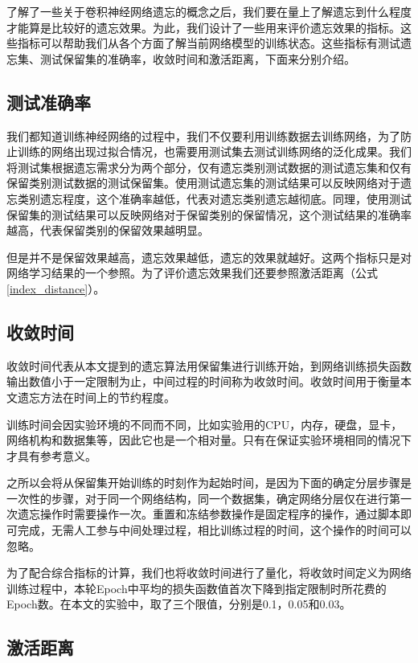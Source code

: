 了解了一些关于卷积神经网络遗忘的概念之后，我们要在量上了解遗忘到什么程度才能算是比较好的遗忘效果。为此，我们设计了一些用来评价遗忘效果的指标。这些指标可以帮助我们从各个方面了解当前网络模型的训练状态。这些指标有测试遗忘集、测试保留集的准确率，收敛时间和激活距离，下面来分别介绍。
\subsection{测试准确率}

我们都知道训练神经网络的过程中，我们不仅要利用训练数据去训练网络，为了防止训练的网络出现过拟合情况，也需要用测试集去测试训练网络的泛化成果。我们将测试集根据遗忘需求分为两个部分，仅有遗忘类别测试数据的测试遗忘集和仅有保留类别测试数据的测试保留集。使用测试遗忘集的测试结果可以反映网络对于遗忘类别遗忘程度，这个准确率越低，代表对遗忘类别遗忘越彻底。同理，使用测试保留集的测试结果可以反映网络对于保留类别的保留情况，这个测试结果的准确率越高，代表保留类别的保留效果越明显。

但是并不是保留效果越高，遗忘效果越低，遗忘的效果就越好。这两个指标只是对网络学习结果的一个参照。为了评价遗忘效果我们还要参照激活距离（公式\ref{index_distance}）。

\subsection{收敛时间}

收敛时间代表从本文提到的遗忘算法用保留集进行训练开始，到网络训练损失函数输出数值小于一定限制为止，中间过程的时间称为收敛时间。收敛时间用于衡量本文遗忘方法在时间上的节约程度。

训练时间会因实验环境的不同而不同，比如实验用的CPU，内存，硬盘，显卡，网络机构和数据集等，因此它也是一个相对量。只有在保证实验环境相同的情况下才具有参考意义。

之所以会将从保留集开始训练的时刻作为起始时间，是因为下面的确定分层步骤是一次性的步骤，对于同一个网络结构，同一个数据集，确定网络分层仅在进行第一次遗忘操作时需要操作一次。重置和冻结参数操作是固定程序的操作，通过脚本即可完成，无需人工参与中间处理过程，相比训练过程的时间，这个操作的时间可以忽略。

为了配合综合指标的计算，我们也将收敛时间进行了量化，将收敛时间定义为网络训练过程中，本轮Epoch中平均的损失函数值首次下降到指定限制时所花费的Epoch数。在本文的实验中，取了三个限值，分别是0.1，0.05和0.03。

\subsection{激活距离}

